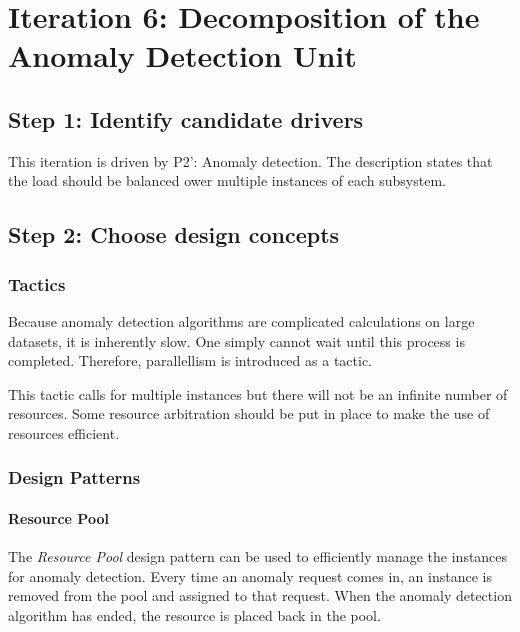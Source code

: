 \section{Iteration 6: Decomposition of the Anomaly Detection Unit}
\label{add:it6}

\subsection{Step 1: Identify candidate drivers}
\label{add:it6/drivers}

\npar This iteration is driven by P2': Anomaly detection. The description states
that the load should be balanced ower multiple instances of each subsystem.

\subsection{Step 2: Choose design concepts}
\label{add:it6/concepts}

\subsubsection{Tactics}
\label{add:it6/tactics}

\npar Because anomaly detection algorithms are complicated calculations on large
datasets, it is inherently slow. One simply cannot wait until this process is
completed. Therefore, parallellism is introduced as a tactic. 

\npar This tactic calls for multiple instances but there will not be an infinite
number of resources. Some resource arbitration should be put in place to make
the use of resources efficient. 

\subsubsection{Design Patterns}
\label{add:it6/patterns}

\paragraph{Resource Pool}

\npar The \emph{Resource Pool} design pattern \citep[see][p.~503]{Buschmann:07}
can be used to efficiently manage the instances for anomaly detection. Every time an
anomaly request comes in, an instance is removed from the pool and assigned to
that request. When the anomaly detection algorithm has ended, the resource is
placed back in the pool. 

